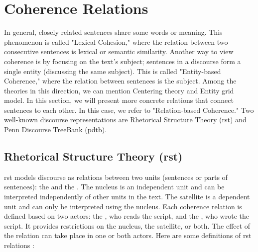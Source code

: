 \documentclass{KBook}
\begin{document}
\section{Coherence Relations}

In general, closely related sentences share some words or meaning. 
This phenomenon is called "Lexical Cohesion," where the relation between two consecutive sentences is lexical or semantic similarity.
Another way to view coherence is by focusing on the text's subject; sentences in a discourse form a single entity (discussing the same subject).
This is called "Entity-based Coherence," where the relation between sentences is the subject.
Among the theories in this direction, we can mention Centering theory and Entity grid model.
In this section, we will present more concrete relations that connect sentences to each other.
In this case, we refer to "Relation-based Coherence."
Two well-known discourse representations are Rhetorical Structure Theory (\ac{rst}) and Penn Discourse TreeBank (\ac{pdtb}).


\vfill

\subsection{Rhetorical Structure Theory (\ac{rst})}

\ac{rst} models discourse as relations between two units (sentences or parts of sentences): the  and the .
The nucleus is an independent unit and can be interpreted independently of other units in the text.
The satellite is a dependent unit and can only be interpreted using the nucleus.
Each coherence relation is defined based on two actors: the , who reads the script, and the , who wrote the script.
It provides restrictions on the nucleus, the satellite, or both.
The effect of the relation can take place in one or both actors.
Here are some definitions of \ac{rst} relations \cite{2006-Cornish}:
\end{document}
